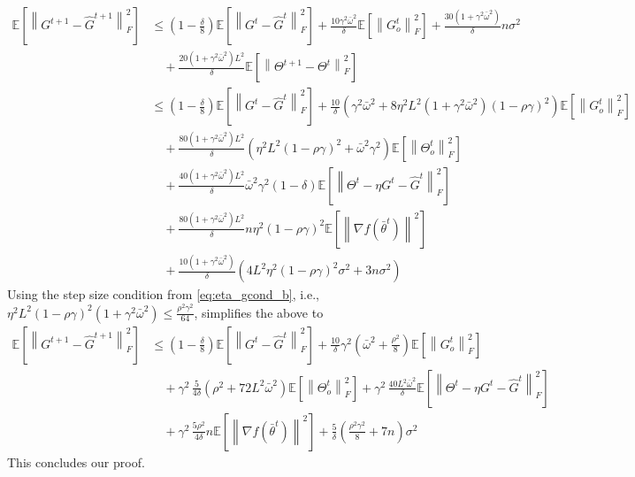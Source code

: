 \documentclass[10pt]{article} %
\theoremstyle{plain}
\theoremstyle{definition}
\theoremstyle{remark}
\newcommand{\prm}{\theta}
\newcommand{\bw}{\bar{\omega}}
\newcommand{\avgtheta}{\bar{\prm}}
\newcommand{\norm}[1]{\left\| #1 \right\|}
\newcommand{\nl}{\nonumber\\}
\begin{document}
\begin{align*}
\mathbb{E} \left[ \norm{ G^{t+1} - \hat{G}^{t+1} }_F^2 \right] & \leq \left(1 - \frac{\delta}{8} \right) \mathbb{E} \left[ \norm{ G^{t} - \hat{G}^{t} }_F^2 \right] + \frac{10 \gamma^2 \bw^2}{\delta} \mathbb{E} \left[ \norm{G_o^t}_F^2 \right] + \frac{30(1+\gamma^2\bw^2)}{\delta} n \sigma^2 \nl
& \quad + \frac{20(1+\gamma^2\bw^2)L^2}{\delta} \mathbb{E} \left[ \norm{ \Theta^{t+1} - \Theta^t }_F^2 \right] \nl 
& \leq \left(1 - \frac{\delta}{8} \right) \mathbb{E} \left[ \norm{ G^{t} - \hat{G}^{t} }_F^2 \right] + \frac{10}{\delta} \left(  \gamma^2 \bw^2 + 8 \eta^2 L^2 (1 + \gamma^2 \bw^2) (1 - \rho \gamma)^2 \right) \mathbb{E} \left[ \norm{G_o^t}_F^2 \right] \nl 
& \quad + \frac{80(1+\gamma^2\bw^2)L^2}{\delta} ( \eta^2 L^2 (1-\rho\gamma)^2 + \bw^2 \gamma^2 ) \mathbb{E} \left[ \norm{\Theta_o^t}_F^2 \right] \nl
& \quad + \frac{40(1+\gamma^2\bw^2)L^2}{\delta} \bw^2 \gamma^2 (1 - \delta) \mathbb{E} \left[ \norm{ \Theta^t - \eta G^t - \hat{G}^t }_F^2 \right] \nl
& \quad + \frac{80(1+\gamma^2\bw^2)L^2}{\delta} n \eta^2 (1 - \rho\gamma)^2 \mathbb{E} \left[ \norm{\nabla f(\avgtheta^t)}^2 \right] \nl
& \quad + \frac{10(1+\gamma^2 \bw^2)}{\delta} \left( 4 L^2 \eta^2 (1 - \rho\gamma)^2 \sigma^2 + 3 n \sigma^2 \right)
\end{align*}
Using the step size condition from \eqref{eq:eta_gcond_b}, i.e., $\eta^2 L^2 (1-\rho \gamma)^2 (1+\gamma^2 \bw^2) \leq \frac{ \rho^2 \gamma^2 }{ 64 }$, simplifies the above to 
\begin{align*}
\mathbb{E} \left[ \norm{ G^{t+1} - \hat{G}^{t+1} }_F^2 \right] & \leq \left(1 - \frac{\delta}{8} \right) \mathbb{E} \left[ \norm{ G^{t} - \hat{G}^{t} }_F^2 \right] + \frac{10}{\delta} \gamma^2 \left( \bw^2 + \frac{\rho^2 }{8} \right) \mathbb{E} \left[ \norm{G_o^t}_F^2 \right] \nl 
& \quad + \gamma^2 \, \frac{5}{4 \delta} \left( \rho^2 + 72 L^2 \bw^2 \right) \mathbb{E} \left[ \norm{\Theta_o^t}_F^2 \right] + \gamma^2 \, \frac{40 L^2 \bw^2}{\delta} \mathbb{E} \left[ \norm{ \Theta^t - \eta G^t - \hat{G}^t }_F^2 \right] \nl
& \quad + \gamma^2 \, \frac{5 \rho^2}{4 \delta} n \mathbb{E} \left[ \norm{\nabla f(\avgtheta^t)}^2 \right]  + \frac{5}{\delta} \left( \frac{\rho^2 \gamma^2}{8} + 7 n \right) \sigma^2
\end{align*}
This concludes our proof.
\end{document}
